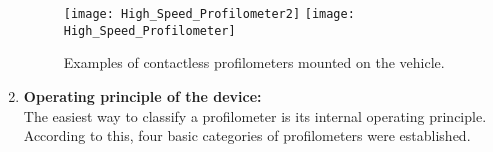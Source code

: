 \documentclass[tesi]{subfiles}
\begin{document}
\begin{enumerate}
\vspace{0.35cm}
\begin{figure}[H]
\centering
\texttt{[image: High\_Speed\_Profilometer2]}
\hspace{1cm}
\texttt{[image: High\_Speed\_Profilometer]}
\caption{Examples of contactless profilometers mounted on the vehicle.}
\label{fig:contact_less_profiler}
\end{figure}

\item \textbf{Operating principle of the device:}\\ The easiest way to classify a profilometer is its internal operating principle.
According to this, four basic categories of profilometers were established\cite{measuring_equipment}.

\begin{description}


\end{description}
\end{enumerate}
\end{document}
